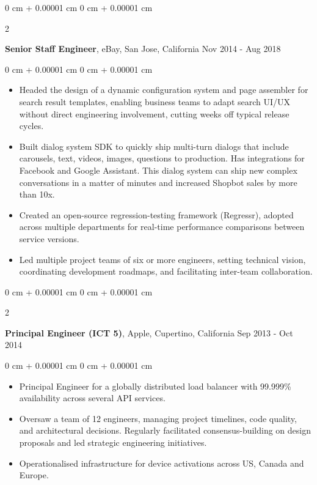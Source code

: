 \documentclass[10pt, letterpaper]{article}
\newenvironment{highlights}{
    \begin{itemize}[
        topsep=0.10 cm,
        parsep=0.10 cm,
        partopsep=0pt,
        itemsep=0pt,
        leftmargin=0 cm + 10pt
    ]
}{
    \end{itemize}
} %
\newenvironment{onecolentry}{
    \begin{adjustwidth}{
        0 cm + 0.00001 cm
    }{
        0 cm + 0.00001 cm
    }
}{
    \end{adjustwidth}
} %
\newenvironment{twocolentry}[2][]{
    \onecolentry
    \def\secondColumn{#2}
    \setcolumnwidth{\fill, 4.5 cm}
    \begin{paracol}{2}
}{
    \switchcolumn \raggedleft \secondColumn
    \end{paracol}
    \endonecolentry
} %
\begin{document}
        \vspace{0.15 cm}
        \begin{twocolentry}{
            Nov 2014 - Aug 2018
        }
            \textbf{Senior Staff Engineer}, eBay, San Jose, California\end{twocolentry}
        \vspace{0.10 cm}
        \begin{onecolentry}
            \begin{highlights}
                \item Headed the design of a dynamic configuration system and page assembler for search result templates, enabling business teams to adapt search UI/UX without direct engineering involvement, cutting weeks off typical release cycles.
                \item Built dialog system SDK to quickly ship multi-turn dialogs that include carousels, text, videos, images, questions to production. Has integrations for Facebook and Google Assistant. This dialog system can ship new complex conversations in a matter of minutes and increased Shopbot sales by more than 10x.
                \item Created an open-source regression-testing framework (Regressr), adopted across multiple departments for real-time performance comparisons between service versions.
                \item Led multiple project teams of six or more engineers, setting technical vision, coordinating development roadmaps, and facilitating inter-team collaboration.
            \end{highlights}
        \end{onecolentry}

        \vspace{0.15 cm}
        \begin{twocolentry}{
            Sep 2013 - Oct 2014
        }
            \textbf{Principal Engineer (ICT 5)}, Apple, Cupertino, California\end{twocolentry}
        \vspace{0.10 cm}
        \begin{onecolentry}
            \begin{highlights}
                \item Principal Engineer for a globally distributed load balancer with 99.999\% availability across several API services.
                \item Oversaw a team of 12 engineers, managing project timelines, code quality, and architectural decisions. Regularly facilitated consensus-building on design proposals and led strategic engineering initiatives.
                \item Operationalised infrastructure for device activations across US, Canada and Europe.
            \end{highlights}
        \end{onecolentry}
\end{document}
